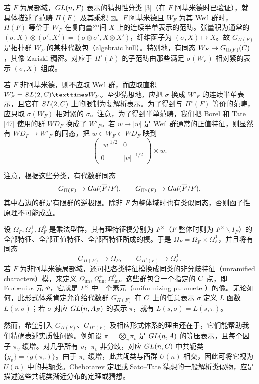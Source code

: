 若 $F$ 为局部域，$GL(n,F)$ 表示的猜想性分类 [3]（在 $F$ 阿基米德时已验证），就具体描述了范畴
$\Pi(F)$ 及其乘积 $\boxtimes$。$F$ 阿基米德且 $W_F$ 为其 Weil 群时，
$\Pi(F)$ 等价于 $W_F$ 在复向量空间 $X$ 上的连续半单表示的范畴。张量积为通常的
$(\sigma,X)\otimes(\sigma',X')=(\sigma\otimes\sigma',X\otimes X')$，纤维函子为
$(\sigma,X)\mapsto X$。故 $G_{\Pi(F)}$ 是拓扑群 $W_F$ 的某种代数包（algebraic hull）。特别地，有同态
$W_F\to G_{\Pi(F)}(C)$，其像 Zariski 稠密。对应于 $\Pi^\circ(F)$ 的子范畴由那些满足 $\sigma(W_F)$ 相对紧的表示 $(\sigma,X)$ 组成。

若 $F$ 非阿基米德，则不应取 Weil 群，而应取直积
$W'_F=\SL(2,\C)\times W_F$。至少猜想地，应把 $\sigma$ 换成
$W'_F$ 的连续半单表示，且它在 $SL(2,C)$ 上的限制为复解析表示。为了得到与
$\Pi^\circ(F)$ 等价的范畴，应只取 $\sigma(W_F)$ 相对紧的 $\sigma$。注意，为了得到半单范畴，我们把 Borel 和 Tate [47] 使用的群 $WD_F$ 换成了
$W'_F$。若 $w\mapsto|w|$ 是 Weil 群通常的正值特征，则显然有
$WD_F\to W'_F$ 的同态，把 $w\in W_F\subset WD_F$ 映到
\[
\begin{pmatrix}|w|^{1/2}&0\\0&|w|^{-1/2}\end{pmatrix}\times w.
\]

注意，根据这些分类，有代数群同态
\[
G_{\Pi(F)}\to Gal(\overline F/F),\qquad
G_{\Pi^\circ(F)}\to Gal(\overline F/F),
\]
其中右边的群是有限群的逆极限。除非 $F$ 为整体域时也有类似同态，否则函子性原理不可能成立。

设 $\Omega_F,\Omega_F^+,\Omega_F^0$ 是乘法型群，其有理特征模分别为
$F^\times$（$F$ 整体时则为 $F^\times\backslash I_F$）的全部特征、全部正值特征、全部酉特征所成的模。于是
$\Omega_F=\Omega_F^+\times\Omega_F^0$，并且将有同态
\[
G_{\Pi(F)}\to\Omega_F,\qquad G_{\Pi^\circ(F)}\to\Omega_F^0.
\]
若 $F$ 为非阿基米德局部域，还可把各类特征模换成同类的非分歧特征（unramified characters）模，来定义
$\Omega_{\mathrm{un}},\Omega_{\mathrm{un}}^+,\Omega_{\mathrm{un}}^0$。这些群包含一个指定的
$C$ 点，即 Frobenius 元 $\Phi$，它就是 $F^\times$ 中一个素元（uniformizing parameter）的像。无论如何，此形式体系肯定允许给代数群 $G_{\Pi(F)}$ 在
$C$ 上的任意表示 $\sigma$ 定义 $L$ 函数 $L(s,\sigma)$；若 $\sigma$ 对应
$GL(n,A_F)$ 的表示 $\pi$，就有 $L(s,\sigma)=L(s,\pi)$。

然而，希望引入 $G_{\Pi(F)}$、$G_{\Pi^\circ(F)}$ 及相应形式体系的理由还在于，它们能帮助我们精确表述实质性问题。例如设
$\pi=\bigotimes_v\pi_v$ 是 $GL(n,A)$ 的等压表示，且每个因子 $\pi_v$ 缓增。对几乎所有
$v$，$\pi_v$ 非分歧，对应 $GL(n,C)$ 中共轭类
$\{g_v\}=\{g(\pi_v)\}$。由于 $\pi_v$ 缓增，此共轭类与酉群 $U(n)$ 相交，因此可将它视为 $U(n)$ 中的共轭类。Chebotarev 定理或 Sato--Tate 猜想的一般解析类似物，应是描述这些共轭类渐近分布的定理或猜想。

